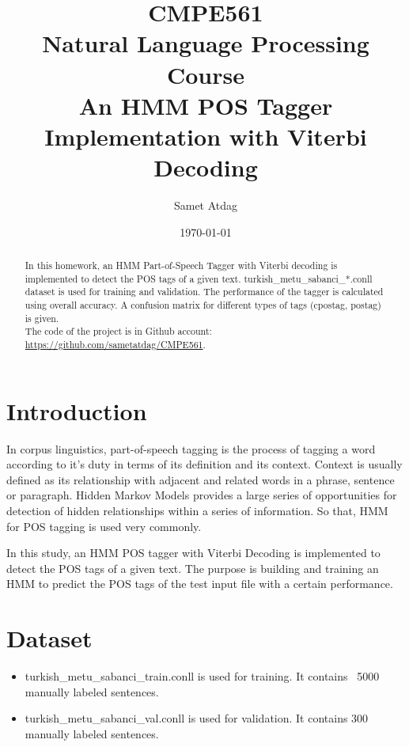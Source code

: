 \documentclass[twocolumn,preprintnumbers,amsmath,amssymb,superscriptaddress,pre]{revtex4}
\theoremstyle{plain}%
\theoremstyle{definition}
\theoremstyle{remark}
\begin{document}
\title{CMPE561 \\ 
Natural Language Processing Course \\
An HMM POS Tagger Implementation with Viterbi Decoding
}
\author{Samet Atdag}
\date{\today}

\begin{abstract}
	In this homework, an HMM Part-of-Speech Tagger with Viterbi decoding is implemented to detect
	the POS tags of a given text. turkish\_metu\_sabanci\_*.conll dataset is used for training and validation.
	The performance of the tagger is calculated using overall accuracy. A confusion matrix for different types
	of tags (cpostag, postag) is given. 
	\\
	
	The code of the project is in Github account: 
	\href{https://github.com/sametatdag/CMPE561}{https://github.com/sametatdag/CMPE561}.
\end{abstract}


\maketitle
\tableofcontents



\section{Introduction}
\label{sec:intro}
In corpus linguistics, part-of-speech tagging is the process of tagging a word according to it's duty in terms of 
its definition and its context. Context is usually defined as its relationship with adjacent and related words in a
phrase, sentence or paragraph. Hidden Markov Models provides a large series of opportunities for detection
of hidden relationships within a series of information. So that, HMM for POS tagging is used very commonly.

In this study, an HMM POS tagger with Viterbi Decoding is implemented to detect the POS tags of a given text. 
The purpose is building and training an HMM to predict the POS tags of the test input file with a certain performance.


\section{Dataset} 
\begin{itemize}[itemsep=0mm]

  \item turkish\_metu\_sabanci\_train.conll is used for training. It contains ~5000 manually labeled sentences.
  \item turkish\_metu\_sabanci\_val.conll is used for validation. It contains 300 manually labeled sentences.

\end{itemize}
\end{document}
